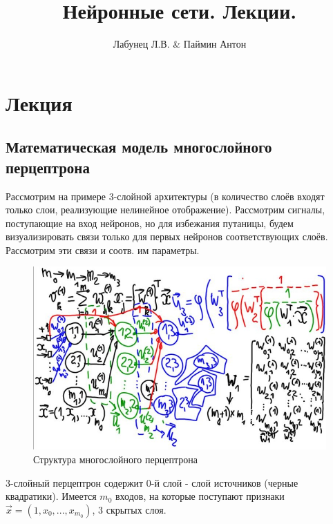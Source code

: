 \documentclass{article}
\numberwithin{equation}{subsection}
\begin{document}
\author{Лабунец Л.В. \& Паймин Антон}
\title{Нейронные сети. Лекции.}

\makeatletter
\begin{center}
    {\fontsize{14pt}{24pt}\selectfont\bfseries\@title\par}
    {\fontsize{14pt}{16pt}\@author\par}
\end{center}
\makeatother

\tableofcontents
\newpage

\section{Лекция}

\subsection{Математическая модель многослойного перцептрона}

Рассмотрим на примере 3-слойной архитектуры (в количество слоёв входят только 
слои, реализующие нелинейное отображение).
Рассмотрим сигналы, поступающие на вход нейронов, но для избежания 
путаницы, будем визуализировать связи только для первых нейронов соответствующих слоёв.
Рассмотрим эти связи и соотв. им параметры.

\begin{figure}[htbp]
    \centering
    \includegraphics[width=\textwidth]{hyperflat_3_1.jpeg}
    \caption{Структура многослойного перцептрона}
    \label{hyperflat_3_1}
\end{figure}

3-слойный перцептрон содержит 0-й слой - слой источников (черные квадратики). 
Имеется $m_{0}$ входов, на которые поступают признаки 
$\vec{x} = (1, x_0, ..., x_{m_{0}})$, 3 скрытых слоя.
\end{document}
